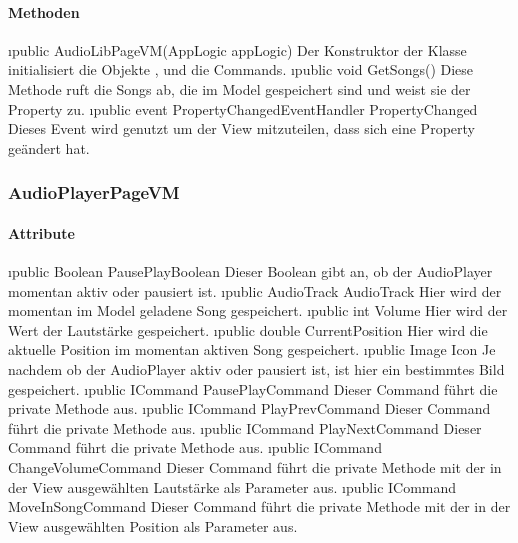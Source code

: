 \documentclass[../entwurf.tex]{subfiles}
\begin{document}
\paragraph{Methoden}
\begin{itemize}
	\i{public AudioLibPageVM(AppLogic appLogic)} Der Konstruktor der Klasse initialisiert die Objekte ,  und die Commands.
	\i{public void GetSongs()} Diese Methode ruft die Songs ab, die im Model gespeichert sind und weist sie der Property  zu.
	\i{public event PropertyChangedEventHandler PropertyChanged} Dieses Event wird genutzt um der View mitzuteilen, dass sich eine Property geändert hat.
\end{itemize}
\subsubsection{AudioPlayerPageVM}
\paragraph{Attribute}
\begin{itemize}
	\i{public Boolean PausePlayBoolean} Dieser Boolean gibt an, ob der AudioPlayer momentan aktiv oder pausiert ist.
	\i{public AudioTrack AudioTrack} Hier wird der momentan im Model geladene Song gespeichert.
	\i{public int Volume} Hier wird der Wert der Lautstärke gespeichert.
	\i{public double CurrentPosition} Hier wird die aktuelle Position im momentan aktiven Song gespeichert.
	\i{public Image Icon} Je nachdem ob der AudioPlayer aktiv oder pausiert ist, ist hier ein bestimmtes Bild gespeichert.
	\i{public ICommand PausePlayCommand} Dieser Command führt die private Methode  aus.
	\i{public ICommand PlayPrevCommand} Dieser Command führt die private Methode  aus.
	\i{public ICommand PlayNextCommand} Dieser Command führt die private Methode  aus.
	\i{public ICommand ChangeVolumeCommand} Dieser Command führt die private Methode  mit der in der View ausgewählten Lautstärke als Parameter aus.
	\i{public ICommand MoveInSongCommand} Dieser Command führt die private Methode  mit der in der View ausgewählten Position als Parameter aus.
\end{itemize}
\end{document}
